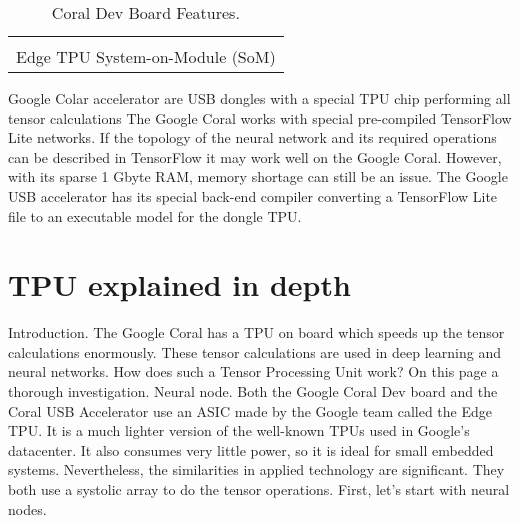 \begin{table}[htb]
	\centering
	\begin{tabular}{c}
	\hline \\
Edge TPU System-on-Module (SoM)\\
\hline
	\end{tabular}
	\caption{Coral Dev Board Features.}
	\label{tab:hard-devboard-spec}
\end{table}

Google Colar accelerator are USB dongles with a special TPU chip performing all
tensor calculations The Google Coral works with special pre-compiled TensorFlow
Lite networks. If the topology of the neural network and its required operations
can be described in TensorFlow it may work well on the Google Coral. However,
with its sparse 1 Gbyte RAM, memory shortage can still be an issue. The Google
USB accelerator has its special back-end compiler converting a TensorFlow Lite
file to an executable model for the dongle TPU.
%
\section{TPU explained in depth}
\label{sec:hard-tpu}

Introduction.
The Google Coral has a TPU on board which speeds up the tensor calculations enormously. These tensor calculations are used in deep learning and neural networks. How does such a Tensor Processing Unit work? On this page a thorough investigation.
Neural node.
Both the Google Coral Dev board and the Coral USB Accelerator use an ASIC made by the Google team called the Edge TPU. It is a much lighter version of the well-known TPUs used in Google's datacenter. It also consumes very little power, so it is ideal for small embedded systems. Nevertheless, the similarities in applied technology are significant. They both use a systolic array to do the tensor operations. First, let's start with neural nodes.

